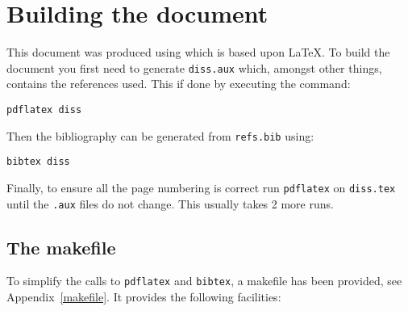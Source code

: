 \documentclass[a4paper,12pt,twoside,openright]{report}
\begin{document}
	\section{Building the document}
	
	This document was produced using \LaTeXe which is based upon
	\LaTeX\cite{Lamport86}.  To build the document you first need to
	generate \texttt{diss.aux} which, amongst other things, contains the
	references used.  This if done by executing the command:
	
	\texttt{pdflatex diss}
	
	\noindent
	Then the bibliography can be generated from \texttt{refs.bib} using:
	
	\texttt{bibtex diss}
	
	\noindent
	Finally, to ensure all the page numbering is correct run \texttt{pdflatex}
	on \texttt{diss.tex} until the \texttt{.aux} files do not change.  This
	usually takes 2 more runs.
	
	\subsection{The makefile}
	
	To simplify the calls to \texttt{pdflatex} and \texttt{bibtex}, 
	a makefile has been provided, see Appendix~\ref{makefile}. 
	It provides the following facilities:
	
\end{document}
